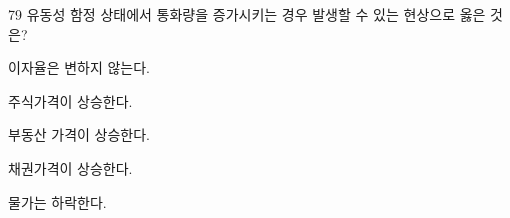 \begin{question}{79}
유동성 함정 상태에서 통화량을 증가시키는 경우 발생할 수 있는 현상으로 옳은 것은?
\begin{choices}
  \item 이자율은 변하지 않는다.
  \item 주식가격이 상승한다.
  \item 부동산 가격이 상승한다.
  \item 채권가격이 상승한다.
  \item 물가는 하락한다.
\end{choices}
\end{question}
